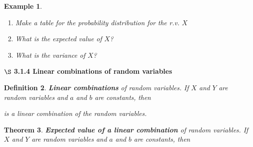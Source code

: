 \documentclass[12pt]{amsart}
\newtheorem{theorem}{Theorem}[section]
\newtheorem{definition}[theorem]{Definition}
\newtheorem{example}[theorem]{Example}
\begin{document}
{\begin{example}
\begin{enumerate}
\item Make a table for the probability distribution for the r.v. $X$

\vspace{3cm}

\item What is the expected value of $X$?

\vspace{5cm}

\item What is the variance of $X$?

\vspace{2cm}
%
\end{enumerate}


\end{example} 





\newpage


$\S$ \textbf{3.1.4 Linear combinations of random variables}

\vspace{1cm}


\begin{definition}{\textbf{Linear combinations} of random variables.} \newline
If $X$ and $Y$ are random variables and $a$ and $b$ are constants, then 
\vspace{2cm}

is a linear combination of the random variables.
\end{definition}



\begin{theorem}{\textbf{Expected value of a linear combination} of random variables.} \newline
If $X$ and $Y$ are random variables and $a$ and $b$ are constants, then 
\vspace{3cm}



\end{theorem}}
\end{document}
